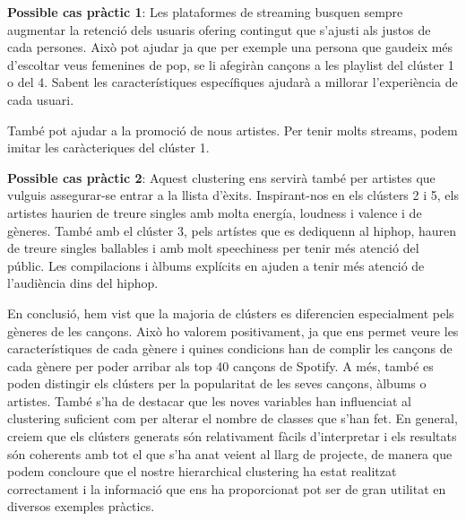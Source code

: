 \documentclass{article}
\begin{document}
\textbf{Possible cas pràctic 1}: Les plataformes de streaming busquen sempre augmentar la retenció dels usuaris ofering contingut que s'ajusti als justos de cada persones. Això pot ajudar ja que per exemple una persona que gaudeix més d'escoltar veus femenines de pop, se li afegiràn cançons a les playlist del clúster 1 o del 4. Sabent les característiques específiques ajudarà a millorar l'experiència de cada usuari. 

També pot ajudar a la promoció de nous artistes. Per tenir molts streams, podem imitar les caràcteriques del clúster 1.

\textbf{Possible cas pràctic 2}: Aquest clustering ens servirà també per artistes que vulguis assegurar-se entrar a la llista d'èxits. Inspirant-nos en els clústers 2 i 5, els artistes haurien de treure singles amb molta energía, loudness i valence i de gèneres. També amb el clúster 3, pels artístes que es dediquenn al hiphop, hauren de treure singles ballables i amb molt speechiness per tenir més atenció del públic. Les compilacions i àlbums explícits en ajuden a tenir més atenció de l'audiència dins del hiphop. 

En conclusió, hem vist que la majoria de clústers es diferencien especialment pels gèneres de les cançons. Això ho valorem positivament, ja que ens permet veure les característiques de cada gènere i quines condicions han de complir les cançons de cada gènere per poder arribar als top 40 cançons de Spotify. A més, també es poden distingir els clústers per la popularitat de les seves cançons, àlbums o artistes. També s'ha de destacar que les noves variables han influenciat al clustering suficient com per alterar el nombre de classes que s'han fet. En general, creiem que els clústers generats són relativament fàcils d'interpretar i els resultats són coherents amb tot el que s'ha anat veient al llarg de projecte, de manera que podem concloure que el nostre hierarchical clustering ha estat realitzat correctament i la informació que ens ha proporcionat pot ser de gran utilitat en diversos exemples pràctics.
\end{document}
